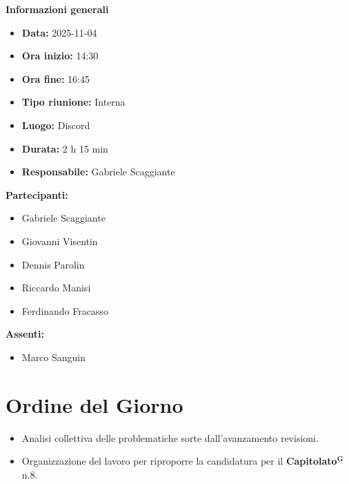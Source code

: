 \documentclass[a4paper,12pt]{article}
\newcommand{\term}[1]{\textbf{#1}$^\mathbf{G}$}
\begin{document}
\clearpage
{\large \textbf{Informazioni generali}}
{\footnotesize
{}

\begin{itemize}
    \item \textbf{Data:} 2025-11-04
    \item \textbf{Ora inizio:} 14:30
    \item \textbf{Ora fine:} 16:45
    \item \textbf{Tipo riunione:} Interna
    \item \textbf{Luogo:} Discord
    \item \textbf{Durata:} 2 h 15 min
    \item \textbf{Responsabile:} Gabriele Scaggiante
\end{itemize}

\vspace{0.2cm}

\textbf{Partecipanti:}
\begin{itemize}
    \item Gabriele Scaggiante
    \item Giovanni Visentin
    \item Dennis Parolin 
    \item Riccardo Manisi
    \item Ferdinando Fracasso
\end{itemize}

\textbf{Assenti:}
\begin{itemize}
    \item Marco Sanguin
\end{itemize}
}

\vspace{0.5cm}

\vspace{0.8cm}

\clearpage
\tableofcontents
\thispagestyle{empty} %
\clearpage

\section{Ordine del Giorno}
\begin{itemize}
    \item Analisi collettiva delle problematiche sorte dall'avanzamento revisioni.
    \item Organizzazione del lavoro per riproporre la candidatura per il \term{Capitolato} n.8.
\end{itemize}
\end{document}
